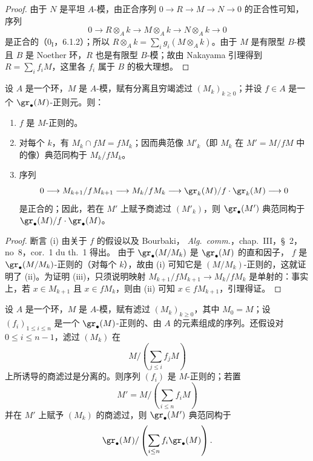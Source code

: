 \begin{proof}
由于 $N$ 是平坦 $A$-模，由正合序列 $0\to R\to M\to N\to0$ 的正合性可知，
序列
\[
  0\longrightarrow R\otimes_A k\longrightarrow M\otimes_A k
  \longrightarrow N\otimes_A k\longrightarrow0
\]
是正合的（$0_{\mathrm I}$，6.1.2）；所以
$R\otimes_A k=\sum_i g_i(M\otimes_A k)$。由于 $M$ 是有限型 $B$-模且
$B$ 是 Noether 环，$R$ 也是有限型 $B$-模；故由 Nakayama 引理得到
$R=\sum_i f_iM$，这里各 $f_i$ 属于 $B$ 的极大理想。
\end{proof}

\begin{lemma}[15.1.18]
\label{0.15.1.18-fr}
设 $A$ 是一个环，$M$ 是 $A$-模，赋有分离且穷竭滤过
$(M_k)_{k\geq0}$；并设 $f\in A$ 是一个 $\gr_\bullet(M)$-正则元。则：
\begin{enumerate}
  \item[(i)] $f$ 是 $M$-正则的。
  \item[(ii)] 对每个 $k$，有 $M_k\cap fM=fM_k$；因而典范像
  $M'_k$（即 $M_k$ 在 $M'=M/fM$ 中的像）典范同构于 $M_k/fM_k$。
  \item[(iii)] 序列
  \[
    0\longrightarrow M_{k+1}/fM_{k+1}\longrightarrow M_k/fM_k
    \longrightarrow\gr_k(M)/f\cdot\gr_k(M)\longrightarrow0
  \]
  是正合的；因此，若在 $M'$ 上赋予商滤过 $(M'_k)$，则
  $\gr_\bullet(M')$ 典范同构于
  $\gr_\bullet(M)/f\cdot\gr_\bullet(M)$。
\end{enumerate}
\end{lemma}

\begin{proof}
断言 (i) 由关于 $f$ 的假设以及 Bourbaki，
\emph{Alg.~comm.}，chap.~III，\S~2，no~8，cor.~1 du th.~1 得出。
由于 $\gr_\bullet(M/M_k)$ 是 $\gr_\bullet(M)$ 的直和因子，
$f$ 是 $\gr_\bullet(M/M_k)$-正则的（对每个 $k$），故由 (i) 可知它是
$(M/M_k)$-正则的，这就证明了 (ii)。为证明 (iii)，只须说明映射
$M_{k+1}/fM_{k+1}\to M_k/fM_k$ 是单射的：事实上，若
$x\in M_{k+1}$ 且 $x\in fM_k$，则由 (ii) 可知
$x\in fM_{k+1}$，引理得证。
\end{proof}

\begin{proposition}[15.1.19]
\label{0.15.1.19-fr}
设 $A$ 是一个环，$M$ 是 $A$-模，赋有滤过 $(M_k)_{k\geq0}$，其中
$M_0=M$；设 $(f_i)_{1\leq i\leq n}$ 是一个
$\gr_\bullet(M)$-正则的、由 $A$ 的元素组成的序列。还假设对
$0\leq i\leq n-1$，滤过 $(M_k)$
在
\[
  M/\left(\sum_{j\leq i}f_jM\right)
\]
上所诱导的商滤过是分离的。则序列 $(f_i)$ 是 $M$-正则的；若置
\[
  M'=M/\left(\sum_{i\leq n}f_iM\right)
\]
并在 $M'$ 上赋予 $(M_k)$ 的商滤过，则 $\gr_\bullet(M')$ 典范同构于
\[
  \gr_\bullet(M)/
  \left(\sum_{i\leq n}f_i\gr_\bullet(M)\right).
\]
\end{proposition}

